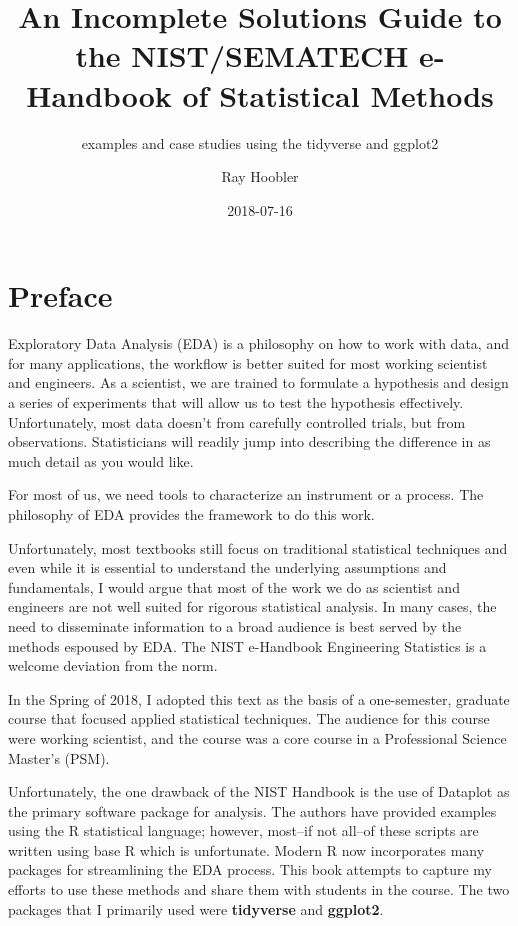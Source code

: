\documentclass[]{book}
\title{An Incomplete Solutions Guide to the NIST/SEMATECH e-Handbook of
Statistical Methods}
\subtitle{examples and case studies using the tidyverse and ggplot2}
\author{Ray Hoobler}
\date{2018-07-16}
\theoremstyle{definition}
\theoremstyle{definition}
\theoremstyle{definition}
\theoremstyle{remark}
\begin{document}
\maketitle

{
\setcounter{tocdepth}{1}
\tableofcontents
}
\hypertarget{preface}{%
\chapter*{Preface}\label{preface}}

Exploratory Data Analysis (EDA) is a philosophy on how to work with
data, and for many applications, the workflow is better suited for most
working scientist and engineers. As a scientist, we are trained to
formulate a hypothesis and design a series of experiments that will
allow us to test the hypothesis effectively. Unfortunately, most data
doesn't from carefully controlled trials, but from observations.
Statisticians will readily jump into describing the difference in as
much detail as you would like.

For most of us, we need tools to characterize an instrument or a
process. The philosophy of EDA provides the framework to do this work.

Unfortunately, most textbooks still focus on traditional statistical
techniques and even while it is essential to understand the underlying
assumptions and fundamentals, I would argue that most of the work we do
as scientist and engineers are not well suited for rigorous statistical
analysis. In many cases, the need to disseminate information to a broad
audience is best served by the methods espoused by EDA. The NIST
e-Handbook Engineering Statistics is a welcome deviation from the norm.

In the Spring of 2018, I adopted this text as the basis of a
one-semester, graduate course that focused applied statistical
techniques. The audience for this course were working scientist, and the
course was a core course in a Professional Science Master's (PSM).

Unfortunately, the one drawback of the NIST Handbook is the use of
Dataplot as the primary software package for analysis. The authors have
provided examples using the R statistical language; however, most--if
not all--of these scripts are written using base R which is unfortunate.
Modern R now incorporates many packages for streamlining the EDA
process. This book attempts to capture my efforts to use these methods
and share them with students in the course. The two packages that I
primarily used were \textbf{tidyverse} and \textbf{ggplot2}.
\end{document}
